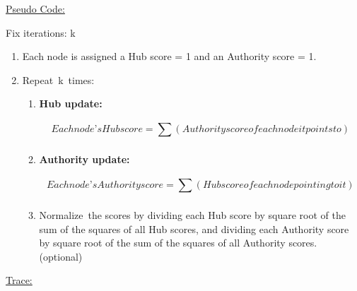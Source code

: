 \documentclass[12pt]{article}
\renewcommand{\_}{\kern-1.5pt\textunderscore\kern-1.5pt}
\begin{document}
\vspace{\baselineskip}
\setlength{\parskip}{8.04pt}
{\fontsize{14pt}{16.8pt}\selectfont \uline{Pseudo Code:}\par}\par

\setlength{\parskip}{0.0pt}
Fix iterations: k\par

\begin{enumerate}
	\item Each node is assigned a Hub score = 1 and an Authority score = 1.\par

	\item Repeat k times:\par

\begin{enumerate}
	\item \textbf{Hub update:} \par

 \[ Each node’s Hub score =  \sum _{}^{} \left( Authority score of each node it points to \right)   \] \par

	\item \textbf{Authority update:} \par

 \[ Each node’s Authority score =  \sum _{}^{} \left( Hub score of each node pointing to it \right)   \] \par

	\item Normalize the scores by dividing each Hub score by square root of the sum of the squares of all Hub scores, and dividing each Authority score by square root of the sum of the squares of all Authority scores. (optional)
\end{enumerate}
\end{enumerate}\par


\vspace{\baselineskip}
\setlength{\parskip}{8.04pt}

\vspace{\baselineskip}

\vspace{\baselineskip}

\vspace{\baselineskip}
{\fontsize{14pt}{16.8pt}\selectfont \uline{Trace:}\par}\par
\end{document}
